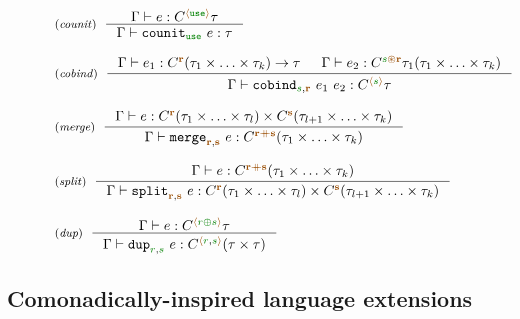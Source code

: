 \begin{figure}[t]
\begin{equation*}
\begin{array}{l}
\tyrule{counit}
  {\Gamma \vdash e : \ctyp{\alift{\cunit}}{\tau}}
  {\Gamma \vdash \ident{counit}_{\cunit}~e : \tau} \\
\\
\tyrule{cobind}
  {\Gamma \vdash e_1 : \ctyp{\aclrd{\textbf{r}}}{(\tau_1 \times \ldots \times \tau_k)} \rightarrow \tau & \Gamma \vdash e_2 : \ctyp{\cclrd{s}\aseq\aclrd{\textbf{r}}}{\tau_1(\tau_1 \times \ldots \times \tau_k)} }
  {\Gamma \vdash \ident{cobind}_{\cclrd{s}, \aclrd{\textbf{r}}}~e_1~e_2 : \ctyp{\alift{\cclrd{s}}}{\tau}} \\
  \\
\tyrule{merge}
  {\Gamma \vdash  e : \ctyp{\aclrd{\textbf{r}}}{(\tau_1 \times \ldots \times \tau_l)} \times \ctyp{\aclrd{\textbf{s}}}{(\tau_{l+1} \times \ldots \times \tau_k)} }
  {\Gamma \vdash  \ident{merge}_{\aclrd{\textbf{r}},\aclrd{\textbf{s}}}~e : \ctyp{\aclrd{\textbf{r}}\atimes\aclrd{\textbf{s}}}{(\tau_1 \times \ldots \times \tau_k)} }\\
\\
\tyrule{split}
  {\Gamma \vdash  e : \ctyp{\aclrd{\textbf{r}}\atimes\aclrd{\textbf{s}}}{(\tau_1 \times \ldots \times \tau_k)} }
  {\Gamma \vdash  \ident{split}_{\aclrd{\textbf{r}},\aclrd{\textbf{s}}}~e : \ctyp{\aclrd{\textbf{r}}}{(\tau_1 \times \ldots \times \tau_l)} \times \ctyp{\aclrd{\textbf{s}}}{(\tau_{l+1} \times \ldots \times \tau_k)}} \\
\\
\tyrule{dup}
  {\Gamma \vdash  e : \ctyp{\alift{\cclrd{r}\cpar\cclrd{s}}}{\tau} }
  {\Gamma \vdash  \ident{dup}_{\cclrd{r},\cclrd{s}}~e : \ctyp{\alift{\cclrd{r},\cclrd{s}}}{(\tau \times \tau)} } \\
\end{array}
\end{equation*}

\label{fig:struct-semantics-ext}
\end{figure}


\subsection{Comonadically-inspired language extensions}
\label{sec:struct-transl-ext}

